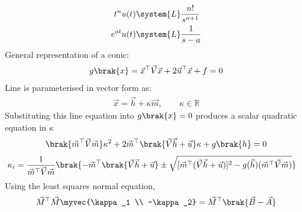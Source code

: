 \begin{enumerate}[label=\thesubsection.\arabic*, ref=\thesubsection.\theenumi]
\begin{align}
			t^n u(t) &\system{L} \frac{n!}{s^{n+1}}\\ 
			e^{at} u(t) &\system{L} \frac{1}{s - a} \label{lap_1}
		\end{align}
		General representation of a conic:
	\begin{align}
	g\brak{x} = \vec{x}^\top \vec{V}\vec{x} + 2\vec{u}^\top \vec{x} + f = 0 \label{conic}
	\end{align}
 Line is parameterised in vector form as:
	\begin{align}
	\vec{x} = \vec{h} + \kappa\vec{m}, \qquad \kappa \in \mathbb{R} \label{line}
	\end{align}
	Substituting this line equation into $g\brak{x} = 0$ produces a scalar quadratic equation in $\kappa$	
	\begin{align}
		\brak{\vec{m}^\top\vec{V}\vec{m}}\kappa^2 + 2\vec{m}^\top\brak{\vec{V}\vec{h} + \vec{u}}\kappa + g\brak{h} = 0
	\end{align}
	\begin{align}
		\kappa_i &= \frac{1}{\vec{m}^\top\vec{V}\vec{m}}\brak{-\vec{m}^\top\brak{\vec{V}\vec{h} + \vec{u}} \pm \sqrt{[\vec{m}^\top(\vec{V}\vec{h} + \vec{u})]^2 - g(\vec{h})(\vec{m}^\top\vec{V}\vec{m})}} \label{k}
	\end{align}
	 Using the least squares normal equation,
	\begin{align}
		\vec{M}^{\top}\vec{M}\myvec{\kappa_1 \\ -\kappa_2} = \vec{M}^{\top}\brak{\vec{B} - \vec{A}}
		\label{eq:least-squares}
	\end{align}
\end{enumerate}